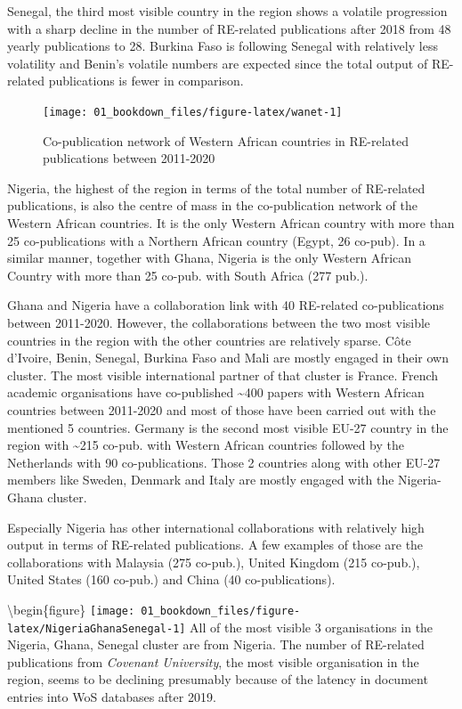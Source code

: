 \documentclass[
]{book}
\begin{document}
Senegal, the third most visible country in the region shows a volatile progression with a sharp decline in the number of RE-related publications after 2018 from 48 yearly publications to 28. Burkina Faso is following Senegal with relatively less volatility and Benin's volatile numbers are expected since the total output of RE-related publications is fewer in comparison.

\begin{figure}
\texttt{[image: 01\_bookdown\_files/figure-latex/wanet-1]} \caption{Co-publication network of Western African countries in RE-related publications between 2011-2020}\label{fig:wanet}
\end{figure}

Nigeria, the highest of the region in terms of the total number of RE-related publications, is also the centre of mass in the co-publication network of the Western African countries. It is the only Western African country with more than 25 co-publications with a Northern African country (Egypt, 26 co-pub). In a similar manner, together with Ghana, Nigeria is the only Western African Country with more than 25 co-pub. with South Africa (277 pub.).

Ghana and Nigeria have a collaboration link with 40 RE-related co-publications between 2011-2020. However, the collaborations between the two most visible countries in the region with the other countries are relatively sparse. Côte d'Ivoire, Benin, Senegal, Burkina Faso and Mali are mostly engaged in their own cluster. The most visible international partner of that cluster is France. French academic organisations have co-published \textasciitilde400 papers with Western African countries between 2011-2020 and most of those have been carried out with the mentioned 5 countries. Germany is the second most visible EU-27 country in the region with \textasciitilde215 co-pub. with Western African countries followed by the Netherlands with 90 co-publications. Those 2 countries along with other EU-27 members like Sweden, Denmark and Italy are mostly engaged with the Nigeria-Ghana cluster.

Especially Nigeria has other international collaborations with relatively high output in terms of RE-related publications. A few examples of those are the collaborations with Malaysia (275 co-pub.), United Kingdom (215 co-pub.), United States (160 co-pub.) and China (40 co-publications).

\textbackslash begin\{figure\}
\texttt{[image: 01\_bookdown\_files/figure-latex/NigeriaGhanaSenegal-1]}
All of the most visible 3 organisations in the Nigeria, Ghana, Senegal cluster are from Nigeria. The number of RE-related publications from \emph{Covenant University}, the most visible organisation in the region, seems to be declining presumably because of the latency in document entries into WoS databases after 2019.
\end{document}

